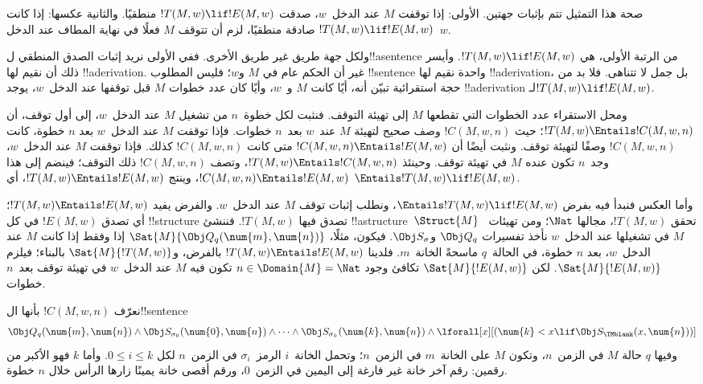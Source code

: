 \documentclass[../../../include/open-logic-section]{subfiles}
\begin{document}

\begin{explain}
صحة هذا التمثيل تتم بإثبات جهتين. الأولى: إذا توقفت $M$ عند
الدخل~$w$، صدقت $!T(M,w)\lif !E(M,w)$ منطقيًا. والثانية عكسها:
إذا كانت $!T(M,w)\lif !E(M,w)$ صادقة منطقيًا، لزم أن تتوقف
$M$ فعلًا في نهاية المطاف عند الدخل~$w$.

ولكل جهة طريق غير طريق الأخرى. ففي الأولى نريد إثبات الصدق
المنطقي ل!!a{sentence} من الرتبة الأولى، هي
$!T(M,w)\lif !E(M,w)$. وأيسر ذلك أن نقيم لها !!a{derivation}.
غير أن الحكم عام في $M$ و$w$؛ فليس المطلوب !!{sentence}
واحدة نقيم لها !!a{derivation}، بل جمل لا تتناهى. فلا بد من
حجة استقرائية تبيّن أنه، أيًا كانت $M$ و~$w$، وأيًا كان عدد
خطوات $M$ قبل توقفها عند الدخل~$w$، يوجد !!a{derivation}
لـ$!T(M,w)\lif !E(M,w)$.

ومحل الاستقراء عدد الخطوات التي تقطعها $M$ إلى تهيئة التوقف.
فنثبت لكل خطوة~$n$ من تشغيل $M$ عند الدخل~$w$، إلى أول توقف،
أن $!T(M,w)\Entails !C(M,w,n)$؛ حيث $!C(M,w,n)$ وصف صحيح
لتهيئة $M$ عند~$w$ بعد~$n$ خطوات. فإذا توقفت $M$ عند
الدخل~$w$ بعد $n$ خطوة، كانت $!C(M,w,n)$ وصفًا لتهيئة توقف.
ونثبت أيضًا أن $!C(M,w,n)\Entails !E(M,w)$ متى كانت
$!C(M,w,n)$ كذلك. فإذا توقفت $M$ عند الدخل~$w$، وجد~$n$
تكون عنده $M$ في تهيئة توقف. وحينئذ
$!T(M,w)\Entails !C(M,w,n)$، وتصف $!C(M,w,n)$ ذلك التوقف؛
فينضم إلى هذا $!C(M,w,n)\Entails !E(M,w)$، وينتج
$!T(M,w)\Entails !E(M,w)$، أي
$\Entails !T(M,w)\lif !E(M,w)$.

وأما العكس فنبدأ فيه بفرض $\Entails !T(M,w)\lif !E(M,w)$،
ونطلب إثبات توقف $M$ عند الدخل~$w$. والفرض يفيد
$!T(M,w)\Entails !E(M,w)$؛ أي تصدق $!E(M,w)$ في كل
!!{structure} تصدق فيها $!T(M,w)$. فننشئ
!!a{structure}~$\Struct{M}$ تحقق $!T(M,w)$، مجالها $\Nat$؛ ومن تهيئات~$M$ في تشغيلها عند الدخل~$w$
نأخذ تفسيرات $\Obj Q_q$ و$\Obj S_\sigma$. فيكون، مثلًا،
$\Sat{M}{\Obj Q_q(\num{m},\num{n})}$ إذا وفقط إذا كانت $M$
عند الدخل~$w$، بعد $n$ خطوة، في الحالة~$q$ ماسحةً الخانة~$m$.
فلدينا $!T(M,w)\Entails !E(M,w)$ بالفرض،
و$\Sat{M}{!T(M,w)}$ بالبناء؛ فيلزم $\Sat{M}{!E(M,w)}$.
لكن $\Sat{M}{!E(M,w)}$ تكافئ وجود $n\in\Domain{M}=\Nat$
تكون فيه $M$ عند الدخل~$w$ في تهيئة توقف بعد~$n$ خطوات.
\end{explain}

\begin{defn}
نعرّف $!C(M,w,n)$ بأنها ال!!{sentence}
\[
\Obj Q_q(\num{m}, \num{n}) \land \Obj S_{\sigma_0}(\num{0}, \num{n})
\land \dots \land \Obj S_{\sigma_k}(\num{k}, \num{n}) \land
\lforall[x][(\num{k} < x \lif \Obj S_\TMblank(x, \num{n}))]
\]
وفيها $q$ حالة $M$ في الزمن~$n$، وتكون $M$ على الخانة~$m$
في الزمن~$n$؛ وتحمل الخانة~$i$ الرمز~$\sigma_i$ في الزمن~$n$
لكل $0\le i\le k$. وأما $k$ فهو الأكبر من رقمين: رقم آخر خانة
غير فارغة إلى اليمين في الزمن~$0$، ورقم أقصى خانة يمينًا زارها
الرأس خلال $n$ خطوة.
\end{defn}
\end{document}
